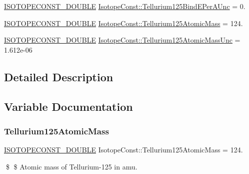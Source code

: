 \begin{DoxyCompactItemize}
\mbox{\hyperlink{group___isotope_const-_macros_ga8f45a7272ce02c0b4c65c44636ed719a}{I\+S\+O\+T\+O\+P\+E\+C\+O\+N\+S\+T\+\_\+\+D\+O\+U\+B\+LE}} \mbox{\hyperlink{group___isotope_const-_tellurium-_te125_ga4646f97e18df3791743643c4fa7e0320}{Isotope\+Const\+::\+Tellurium125\+Bind\+E\+Per\+A\+Unc}} = 0.
\item 
\mbox{\hyperlink{group___isotope_const-_macros_ga8f45a7272ce02c0b4c65c44636ed719a}{I\+S\+O\+T\+O\+P\+E\+C\+O\+N\+S\+T\+\_\+\+D\+O\+U\+B\+LE}} \mbox{\hyperlink{group___isotope_const-_tellurium-_te125_gaf462a898ed96414e670dae863b329375}{Isotope\+Const\+::\+Tellurium125\+Atomic\+Mass}} = 124.
\item 
\mbox{\hyperlink{group___isotope_const-_macros_ga8f45a7272ce02c0b4c65c44636ed719a}{I\+S\+O\+T\+O\+P\+E\+C\+O\+N\+S\+T\+\_\+\+D\+O\+U\+B\+LE}} \mbox{\hyperlink{group___isotope_const-_tellurium-_te125_gaeed4fbfadf4d7740610e5e346d11883f}{Isotope\+Const\+::\+Tellurium125\+Atomic\+Mass\+Unc}} = 1.\+612e-\/06
\end{DoxyCompactItemize}


\subsection{Detailed Description}


\subsection{Variable Documentation}
\mbox{\label{group___isotope_const-_tellurium-_te125_gaf462a898ed96414e670dae863b329375}} 
\subsubsection{\texorpdfstring{Tellurium125\+Atomic\+Mass}{Tellurium125AtomicMass}}
{\footnotesize\ttfamily \mbox{\hyperlink{group___isotope_const-_macros_ga8f45a7272ce02c0b4c65c44636ed719a}{I\+S\+O\+T\+O\+P\+E\+C\+O\+N\+S\+T\+\_\+\+D\+O\+U\+B\+LE}} Isotope\+Const\+::\+Tellurium125\+Atomic\+Mass = 124.}

\$ \$ Atomic mass of Tellurium-\/125 in amu. \mbox{\label{group___isotope_const-_tellurium-_te125_gaeed4fbfadf4d7740610e5e346d11883f}} 
